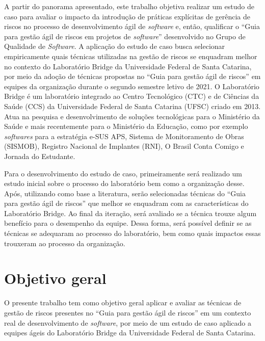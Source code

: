 \documentclass[
    12pt,       %
    openright,      %
    twoside,      %
    a4paper,      %
    english,      %
    french,       %
    spanish,      %
    brazil,       %
    ]{abntex2}
\begin{document}
A partir do panorama apresentado, este trabalho objetiva realizar um estudo de caso para avaliar o impacto da introdução de práticas explícitas de gerência de riscos no processo de desenvolvimento ágil de \textit{software} e, então, qualificar o ``Guia para gestão ágil de riscos em projetos de \textit{software}'' desenvolvido no Grupo de Qualidade de \textit{Software}. A aplicação do estudo de caso busca selecionar empiricamente quais técnicas utilizadas na gestão de riscos se enquadram melhor no contexto do Laboratório Bridge da Universidade Federal de Santa Catarina, por meio da adoção de técnicas propostas no “Guia para gestão ágil de riscos” \cite{Vieira:2020} em equipes da organização durante o segundo semestre letivo de 2021. O Laboratório Bridge é um laboratório integrado ao Centro Tecnológico (CTC) e de Ciências da Saúde (CCS) da Universidade Federal de Santa Catarina (UFSC) criado em 2013. Atua na pesquisa e desenvolvimento de soluções tecnológicas para o Ministério da Saúde e mais recentemente para o Ministério da Educação, como por exemplo \textit{softwares} para a estratégia e-SUS APS, Sistema de Monitoramento de Obras (SISMOB), Registro Nacional de Implantes (RNI), O Brasil Conta Comigo e Jornada do Estudante.

Para o desenvolvimento do estudo de caso, primeiramente será realizado um estudo inicial sobre o processo do laboratório bem como a organização desse. Após, utilizando como base a literatura, serão selecionadas técnicas do “Guia para gestão ágil de riscos” \cite{Vieira:2020} que melhor se enquadram com as características do Laboratório Bridge. Ao final da iteração, será avaliado se a técnica trouxe algum benefício para o desempenho da equipe. Dessa forma, será possível definir se as técnicas se adequaram ao processo do laboratório, bem como quais impactos essas trouxeram ao processo da organização.

\section{Objetivo geral}

O presente trabalho tem como objetivo geral aplicar e avaliar as técnicas de gestão de riscos presentes no “Guia para gestão ágil de riscos” \cite{Vieira:2020} em um contexto real de desenvolvimento de \textit{software}, por meio de um estudo de caso aplicado a equipes ágeis do Laboratório Bridge da Universidade Federal de Santa Catarina.
\end{document}
